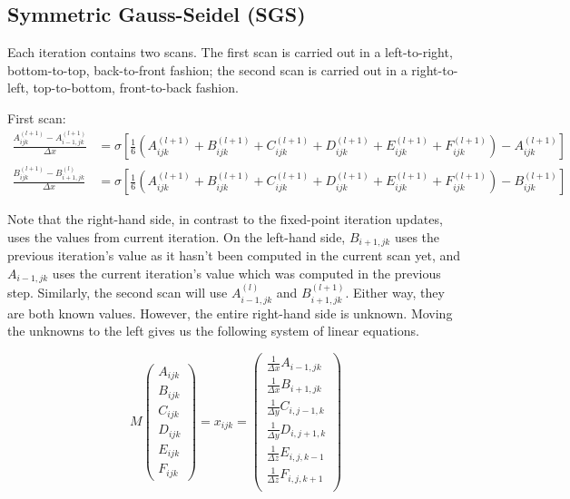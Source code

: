 \documentclass[11pt,titlepage]{article}
\begin{document}
\newpage
\subsection{Symmetric Gauss-Seidel (SGS)}

Each iteration contains two scans. The first scan is carried out in a
left-to-right, bottom-to-top, back-to-front fashion; the second scan is carried out in a right-to-left,
top-to-bottom, front-to-back fashion.

First scan:
\begin{align*}
    \frac{A^{(l + 1)}_{ijk} - A^{(l + 1)}_{i-1,jk}}{\Delta x} &=
    \sigma [\frac{1}{6}(A^{(l + 1)}_{ijk} + B^{(l + 1)}_{ijk} + C^{(l + 1)}_{ijk} + D^{(l + 1)}_{ijk} + E^{(l + 1)}_{ijk} +
    F^{(l + 1)}_{ijk}) - A^{(l + 1)}_{ijk}] \\
    \frac{B^{(l + 1)}_{ijk} - B^{(l)}_{i+1,jk}}{\Delta x} &=
    \sigma [\frac{1}{6}(A^{(l + 1)}_{ijk} + B^{(l + 1)}_{ijk} + C^{(l + 1)}_{ijk} + D^{(l + 1)}_{ijk} + E^{(l + 1)}_{ijk} +
    F^{(l + 1)}_{ijk}) - B^{(l + 1)}_{ijk}]
\end{align*}

Note that the right-hand side, in contrast to the fixed-point iteration updates, uses the values from current iteration. On
the left-hand side, $B_{i+1,jk}$ uses the previous iteration's value as it hasn't been computed in the current scan yet,
and $A_{i-1,jk}$ uses the current iteration's value which was computed in the previous step. Similarly, the second
scan will use $A_{i-1,jk}^{(l)}$ and $B_{i+1,jk}^{(l + 1)}$. Either way, they are both known values. However, the
entire right-hand side is unknown. Moving the unknowns to the left gives us the following system of linear equations.

$$
M\begin{pmatrix}
    A_{ijk}\\
    B_{ijk}\\
    C_{ijk}\\
    D_{ijk}\\
    E_{ijk}\\
F_{ijk}\end{pmatrix} = x_{ijk} = 
\begin{pmatrix}
    \frac{1}{\Delta x}A_{i-1,jk}\\
    \frac{1}{\Delta x}B_{i+1,jk}\\
    \frac{1}{\Delta y}C_{i,j-1,k}\\
    \frac{1}{\Delta y}D_{i,j+1,k}\\
    \frac{1}{\Delta z}E_{i,j,k-1}\\
    \frac{1}{\Delta z}F_{i,j,k+1}\\
\end{pmatrix}
$$
\end{document}

